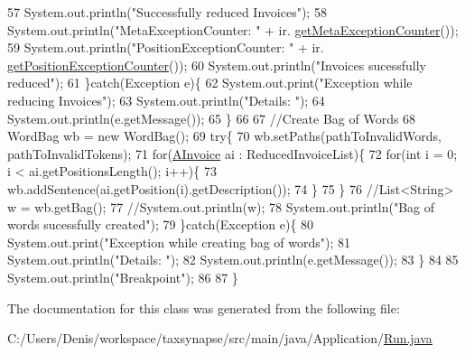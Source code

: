 \begin{DoxyCode}
57             System.out.println(\textcolor{stringliteral}{"Successfully reduced Invoices"});
58             System.out.println(\textcolor{stringliteral}{"MetaExceptionCounter: "} + ir.
      \hyperlink{class_reduced_invoice_1_1_invoice_reducer_a987de6f3876284a7b456240f85dc066f}{getMetaExceptionCounter}());
59             System.out.println(\textcolor{stringliteral}{"PositionExceptionCounter: "} + ir.
      \hyperlink{class_reduced_invoice_1_1_invoice_reducer_ad5034d72d8eae0edc2026c9ca9e66465}{getPositionExceptionCounter}());
60             System.out.println(\textcolor{stringliteral}{"Invoices sucessfully reduced"});
61         \}\textcolor{keywordflow}{catch}(Exception e)\{
62             System.out.print(\textcolor{stringliteral}{"Exception while reducing Invoices"});
63             System.out.println(\textcolor{stringliteral}{"Details: "});
64             System.out.println(e.getMessage());
65         \}
66         
67         \textcolor{comment}{//Create Bag of Words}
68         WordBag wb = \textcolor{keyword}{new} WordBag();
69         \textcolor{keywordflow}{try}\{
70             wb.setPaths(pathToInvalidWords, pathToInvalidTokens);
71             \textcolor{keywordflow}{for}(\hyperlink{class_reduced_invoice_1_1_a_invoice}{AInvoice} ai : ReducedInvoiceList)\{
72                 \textcolor{keywordflow}{for}(\textcolor{keywordtype}{int} i = 0; i < ai.getPositionsLength(); i++)\{
73                     wb.addSentence(ai.getPosition(i).getDescription());
74                 \}
75             \}
76             \textcolor{comment}{//List<String> w = wb.getBag();}
77             \textcolor{comment}{//System.out.println(w);}
78             System.out.println(\textcolor{stringliteral}{"Bag of words sucessfully created"});
79         \}\textcolor{keywordflow}{catch}(Exception e)\{
80             System.out.print(\textcolor{stringliteral}{"Exception while creating bag of words"});
81             System.out.println(\textcolor{stringliteral}{"Details: "});
82             System.out.println(e.getMessage());
83         \}
84         
85         System.out.println(\textcolor{stringliteral}{"Breakpoint"});
86         
87     \}
\end{DoxyCode}


The documentation for this class was generated from the following file\+:\begin{DoxyCompactItemize}
\item 
C\+:/\+Users/\+Denis/workspace/taxsynapse/src/main/java/\+Application/\hyperlink{_run_8java}{Run.\+java}\end{DoxyCompactItemize}
